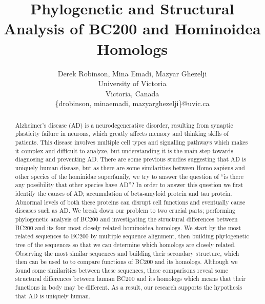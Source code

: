 \documentclass[conference, 11pt]{IEEEtran}
\begin{document}


\title{Phylogenetic and Structural Analysis of BC200 and Hominoidea Homologs}

\author{Derek Robinson, Mina Emadi, Mazyar Ghezelji\\
University of Victoria\\
Victoria, Canada \\
\{drobinson, minaemadi, mazyarghezelji\}@uvic.ca}

\maketitle

\begin{abstract}
Alzheimer’s disease (AD) is a neurodegenerative disorder, resulting from synaptic plasticity failure in neurons, which greatly affects memory and thinking skills of patients.
This disease involves multiple cell types and signalling pathways which makes it complex and difficult to analyze, but understanding it is the main step towards diagnosing and preventing AD.
There are some previous studies suggesting that AD is uniquely human disease, but as there are some similarities between Homo sapiens and other species of the hominidae superfamily, we try to answer the question of ``is there any possibility that other species have AD''?
In order to answer this question we first identify the causes of AD; accumulation of beta-amyloid protein and tau protein. Abnormal levels of both these proteins can disrupt cell functions and eventually cause diseases such as AD. 
We break down our problem to two crucial parts; performing phylogenetic analysis of BC200 and investigating the structural differences between BC200 and its four most closely related hominoidea homologs.
We start by the most related sequences to BC200 by multiple sequence alignment, then building phylogenetic tree of the sequences so that we can determine which homologs are closely related.
Observing the most similar sequences and building their secondary structure, which then can be used to to compare functions of BC200 and its homologs. 
Although we found some similarities between these sequences, these comparisons reveal some structural differences between human BC200 and its homologs which means that their functions in body may be different.
As a result, our research supports the hypothesis that AD is uniquely human.

\end{abstract}
\end{document}
